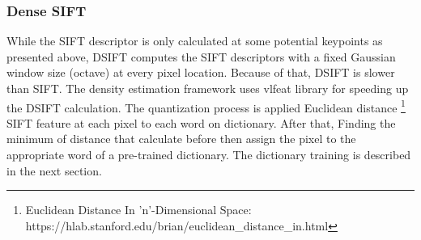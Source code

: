 



\subsubsection{Dense SIFT}


While the SIFT descriptor is only calculated at some potential keypoints as presented above, DSIFT computes the SIFT descriptors with a fixed Gaussian window size (octave) at every pixel location. Because of that, DSIFT is slower than SIFT. The density estimation framework uses vlfeat library \cite{VLFeat} for speeding up the DSIFT calculation. The quantization process is applied Euclidean distance \footnote{Euclidean Distance In 'n'-Dimensional Space: 
https://hlab.stanford.edu/brian/euclidean\_distance\_in.html } SIFT feature at each pixel to each word on dictionary. After that, Finding the minimum of distance that calculate before then assign the pixel to the appropriate word of a pre-trained dictionary. The dictionary training is described in the next section.

